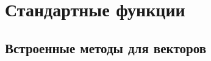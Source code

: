 \hypertarget{stdfuncs}{%
\section{Стандартные функции}\label{stdfuncs:chapter}}

\hypertarget{stdvector}{%
\subsection{Встроенные методы для векторов}\label{stdfuncs:stdvector}}

